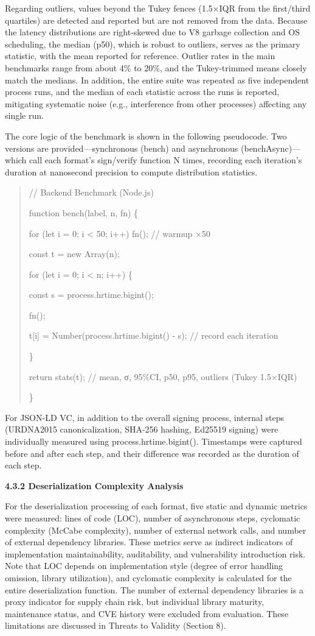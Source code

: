 Regarding outliers, values beyond the Tukey fences (1.5×IQR from the first/third quartiles) are detected and reported but are not removed from the data. Because the latency distributions are right-skewed due to V8 garbage collection and OS scheduling, the median (p50), which is robust to outliers, serves as the primary statistic, with the mean reported for reference. Outlier rates in the main benchmarks range from about 4\% to 20\%, and the Tukey-trimmed means closely match the medians. In addition, the entire suite was repeated as five independent process runs, and the median of each statistic across the runs is reported, mitigating systematic noise (e.g., interference from other processes) affecting any single run.

The core logic of the benchmark is shown in the following pseudocode. Two versions are provided---synchronous (bench) and asynchronous (benchAsync)---which call each format's sign/verify function N times, recording each iteration's duration at nanosecond precision to compute distribution statistics.

\begin{quote}
// Backend Benchmark (Node.js)

function bench(label, n, fn) \{

for (let i = 0; i \textless{} 50; i++) fn(); // warmup ×50

const t = new Array(n);

for (let i = 0; i \textless{} n; i++) \{

const s = process.hrtime.bigint();

fn();

t{[}i{]} = Number(process.hrtime.bigint() - s); // record each iteration

\}

return stats(t); // mean, σ, 95\%CI, p50, p95, outliers (Tukey 1.5×IQR)

\}
\end{quote}

For JSON-LD VC, in addition to the overall signing process, internal steps (URDNA2015 canonicalization, SHA-256 hashing, Ed25519 signing) were individually measured using process.hrtime.bigint(). Timestamps were captured before and after each step, and their difference was recorded as the duration of each step.

\textbf{4.3.2 Deserialization Complexity Analysis}

For the deserialization processing of each format, five static and dynamic metrics were measured: lines of code (LOC), number of asynchronous steps, cyclomatic complexity (McCabe complexity), number of external network calls, and number of external dependency libraries. These metrics serve as indirect indicators of implementation maintainability, auditability, and vulnerability introduction risk. Note that LOC depends on implementation style (degree of error handling omission, library utilization), and cyclomatic complexity is calculated for the entire deserialization function. The number of external dependency libraries is a proxy indicator for supply chain risk, but individual library maturity, maintenance status, and CVE history were excluded from evaluation. These limitations are discussed in Threats to Validity (Section 8).

